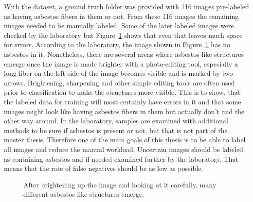 With the dataset, a ground truth folder was provided with 116 images pre-labeled as having asbestos fibers in them or not. From these 116 images the remaining images needed to be manually labeled. Some of the later labeled images were checked by the laboratory but Figure~\ref{fig:wrong_asbestos_labeling} shows that even that leaves much space for errors.  According to the laboratory, the image shown in Figure~\ref{fig:wrong_asbestos_labeling} has no asbestos in it. Nonetheless, there are several areas where asbestos-like structures emerge once the image is made brighter with a photo-editing tool, especially a long fiber on the left side of the image becomes visible and is marked by two arrows. Brightening, sharpening and other simple editing tools are often used prior to classification to make the structures more visible. This is to show, that the labeled data for training will most certainly have errors in it and that some images might look like having asbestos fibers in them but actually don't and the other way around. In the laboratory, samples are examined with additional methods to be sure if asbestos is present or not, but that is not part of the master thesis. Therefore one of the main goals of this thesis is to be able to label all images and reduce the manual workload. Uncertain images should be labeled as containing asbestos and if needed examined further by the laboratory. That means that the rate of false negatives should be as low as possible.

\begin{figure}[h]
\centering
\caption{After brightening up the image and looking at it carefully, many different asbestos like structures emerge.}
\label{fig:wrong_asbestos_labeling}
\end{figure}

